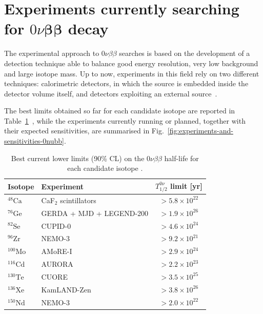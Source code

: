 \section{Experiments currently searching for \texorpdfstring{$0\nu\boldsymbol{\beta}\boldsymbol{\beta}$}{0nu beta beta} decay}
\label{sec:0nubb-experiments}
The experimental approach to $0\nu\beta\beta$ searches is based on the development of a detection technique able to balance good energy resolution, very low background and large isotope mass. Up to now, experiments in this field rely on two different techniques: calorimetric detectors, in which the source is embedded inside the detector volume itself, and detectors exploiting an external source~\cite{review-0nu-2015}. 

The best limits obtained so far for each candidate isotope are reported in Table~\ref{tab:0nubb-limits}~\cite{PDG:2026}, while the experiments currently running or planned, together with their expected sensitivities, are summarised in Fig.~\ref{fig:experiments-and-sensitivities-0nubb}.
\begin{table}[H]
    \centering
    \begin{tabular}{llc}
        \toprule
        Isotope & Experiment & $T_{1/2}^{0\nu}$ limit [yr] \\
        \midrule
        ${}^{48}\text{Ca}$  & CaF$_2$ scintillators     & $> 5.8 \times 10^{22}$ \\
        \rowcolor{greyblue}
        ${}^{76}\text{Ge}$  & GERDA + MJD + LEGEND-200  & $> 1.9 \times 10^{26}$ \\
        ${}^{82}\text{Se}$  & CUPID-0                   & $> 4.6 \times 10^{24}$ \\
        ${}^{96}\text{Zr}$  & NEMO-3                    & $> 9.2 \times 10^{21}$ \\
        ${}^{100}\text{Mo}$ & AMoRE-I                   & $> 2.9 \times 10^{24}$ \\
        ${}^{116}\text{Cd}$ & AURORA                    & $> 2.2 \times 10^{23}$ \\
        ${}^{130}\text{Te}$ & CUORE                     & $> 3.5 \times 10^{25}$ \\
        ${}^{136}\text{Xe}$ & KamLAND-Zen               & $> 3.8 \times 10^{26}$ \\
        ${}^{150}\text{Nd}$ & NEMO-3                    & $> 2.0 \times 10^{22}$ \\
        \bottomrule
    \end{tabular}
    \caption{Best current lower limits (90\% CL) on the $0\nu\beta\beta$ half-life for each candidate isotope \cite{PDG:2026}.}
    \label{tab:0nubb-limits}
\end{table}

